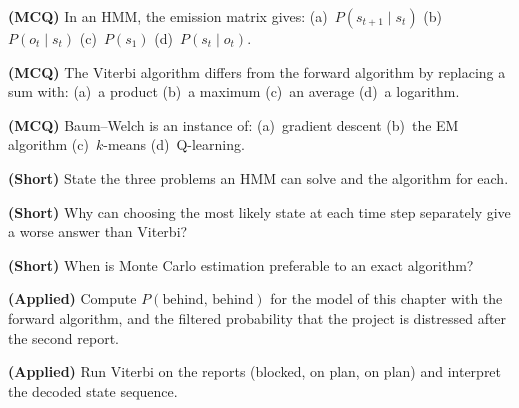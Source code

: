 \begin{reviewq}
  \item \textbf{(MCQ)} In an HMM, the emission matrix gives: (a)~$P(s_{t+1} \mid s_t)$
        (b)~$P(o_t \mid s_t)$ (c)~$P(s_1)$ (d)~$P(s_t \mid o_t)$.
  \item \textbf{(MCQ)} The Viterbi algorithm differs from the forward algorithm by
        replacing a sum with: (a)~a product (b)~a maximum (c)~an average (d)~a
        logarithm.
  \item \textbf{(MCQ)} Baum--Welch is an instance of: (a)~gradient descent
        (b)~the EM algorithm (c)~$k$-means (d)~Q-learning.
  \item \textbf{(Short)} State the three problems an HMM can solve and the algorithm
        for each.
  \item \textbf{(Short)} Why can choosing the most likely state at each time step
        separately give a worse answer than Viterbi?
  \item \textbf{(Short)} When is Monte Carlo estimation preferable to an exact
        algorithm?
  \item \textbf{(Applied)} Compute $P(\text{behind, behind})$ for the model of this
        chapter with the forward algorithm, and the filtered probability that the
        project is distressed after the second report.
  \item \textbf{(Applied)} Run Viterbi on the reports (blocked, on plan, on plan) and
        interpret the decoded state sequence.
\end{reviewq}
